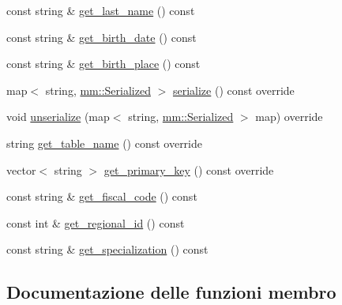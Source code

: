\begin{DoxyCompactItemize}
\item 
const string \& \mbox{\hyperlink{classmm_1_1model_1_1_doctor_a86a186641c22223ecb9951112befa3e9}{get\+\_\+last\+\_\+name}} () const
\item 
const string \& \mbox{\hyperlink{classmm_1_1model_1_1_doctor_afa648dfa2f37c1de94a742bd58682899}{get\+\_\+birth\+\_\+date}} () const
\item 
const string \& \mbox{\hyperlink{classmm_1_1model_1_1_doctor_a14283e664d8689ad296e46969c129cad}{get\+\_\+birth\+\_\+place}} () const
\item 
map$<$ string, \mbox{\hyperlink{structmm_1_1_serialized}{mm\+::\+Serialized}} $>$ \mbox{\hyperlink{classmm_1_1model_1_1_doctor_a2171a9cb9c8a24ad0c0331edae957910}{serialize}} () const override
\item 
void \mbox{\hyperlink{classmm_1_1model_1_1_doctor_a20bedf6695024e1930d033995a2ec5bf}{unserialize}} (map$<$ string, \mbox{\hyperlink{structmm_1_1_serialized}{mm\+::\+Serialized}} $>$ map) override
\item 
string \mbox{\hyperlink{classmm_1_1model_1_1_doctor_af4c37e48f9e5ff26f2295678f10afaa3}{get\+\_\+table\+\_\+name}} () const override
\item 
vector$<$ string $>$ \mbox{\hyperlink{classmm_1_1model_1_1_doctor_a935989cbe2274076c2b409126d4faccd}{get\+\_\+primary\+\_\+key}} () const override
\item 
const string \& \mbox{\hyperlink{classmm_1_1model_1_1_doctor_ad49c6f0fdc31a96edaeada72ba88ceec}{get\+\_\+fiscal\+\_\+code}} () const
\item 
const int \& \mbox{\hyperlink{classmm_1_1model_1_1_doctor_a26810a7e1e0682d2dbb7c92ac3a8247b}{get\+\_\+regional\+\_\+id}} () const
\item 
const string \& \mbox{\hyperlink{classmm_1_1model_1_1_doctor_ab5b807b5ce91d9f20603f091e62fe17a}{get\+\_\+specialization}} () const
\end{DoxyCompactItemize}


\subsection{Documentazione delle funzioni membro}
\mbox{\label{classmm_1_1model_1_1_doctor_afa648dfa2f37c1de94a742bd58682899}} 
